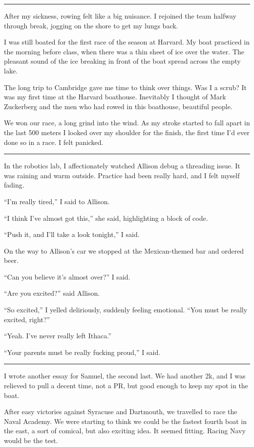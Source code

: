 \plainfancybreak{12pt}{2}{* * *}

After my sickness, rowing felt like a big nuisance.  I rejoined the team halfway
through break, jogging on the shore to get my lungs back.  

I was still boated for the first race of the season at Harvard.  My boat
practiced in the morning before class, when there was a thin sheet of ice over
the water.   The pleasant sound of the ice breaking in front of the boat spread
across the empty lake.
 
The long trip to Cambridge gave me time to think over things.  Was I a scrub?
It was my first time at the Harvard boathouse.  Inevitably I thought of Mark
Zuckerberg and the men who had rowed in this boathouse, beautiful people. 

We won our race, a long grind into the wind.  As my stroke started to fall apart
in the last 500 meters I looked over my shoulder for the finish, the first time
I'd ever done so in a race.  I felt panicked.

\plainfancybreak{12pt}{2}{* * *}

In the robotics lab, I affectionately watched Allison debug a threading issue.
It was raining and warm outside.  Practice had been really hard, and I felt
myself fading.

``I'm really tired,'' I said to Allison.

``I think I've almost got this,'' she said, highlighting a block of code.

``Push it, and I'll take a look tonight,'' I said.

On the way to Allison's car we stopped at the Mexican-themed bar and ordered
beer.

``Can you believe it's almost over?'' I said.

``Are you excited?'' said Allison.

``So excited,'' I yelled deliriously, suddenly feeling emotional.  ``You must be
really excited, right?''

``Yeah.  I've never really left Ithaca.''

``Your parents must be really fucking proud,'' I said.

\plainfancybreak{12pt}{2}{* * *}

I wrote another essay for Samuel, the second last.  We had another 2k, and I was
relieved to pull a decent time, not a PR, but good enough to keep my spot in the
boat.

After easy victories against Syracuse and Dartmouth, we travelled to race the
Naval Academy.  We were starting to think we could be the fastest fourth boat in
the east, a sort of comical, but also exciting idea.  It seemed fitting.  Racing
Navy would be the test.

